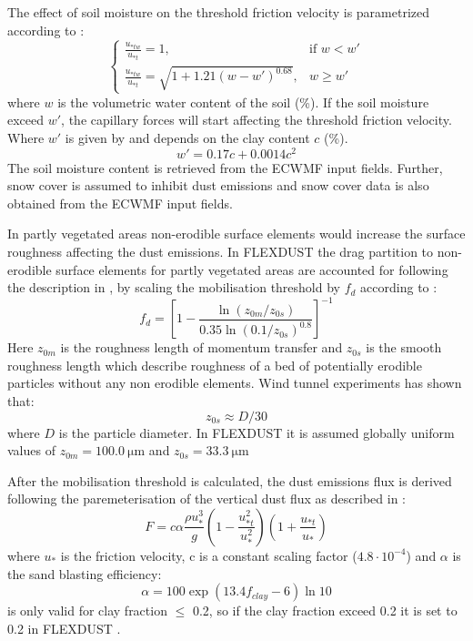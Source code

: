 The effect of soil moisture on the threshold friction velocity is parametrized according to \textcite{fecan1998parametrization}:
\begin{equation}
    \begin{cases}
    \frac{u_{*tw}}{u_{*t}}=1, & \text{if } w < w' \\
    \frac{u_{*tw}}{u_{*t}}=\sqrt{1+1.21(w-w')^{0.68}}, & w \geq w'
    \end{cases}
\end{equation}
where $w$ is the volumetric water content of the soil (\%). If the soil moisture exceed $w'$, the capillary 
forces will start affecting the threshold friction velocity. Where $w'$ is given by  
and depends on the clay content $c$ (\%).   
\begin{equation} \label{eq:moisture_clay}
    w' = 0.17c + 0.0014c^2
\end{equation}
The soil moisture content is retrieved from the ECWMF input fields. Further, snow cover is 
assumed to inhibit dust emissions and snow cover data is also obtained from the ECWMF input fields. 
\par In partly vegetated areas non-erodible surface elements would increase the surface 
roughness affecting the dust emissions. In FLEXDUST the drag partition to non-erodible 
surface elements for partly vegetated areas are accounted for following the description in 
\parencite{zender2003mineral}, by scaling the mobilisation threshold by $f_d$ according to :
\begin{equation}\label{eq:drag_partition}
    f_d = \left[1 - \frac{\ln (z_{0m}/z_{0s})}{0.35\ln (0.1/z_{0s})^{0.8}}\right]^{-1}
\end{equation}
Here $z_{0m}$ is the roughness length of momentum transfer and $z_{0s}$ is the smooth roughness length which 
describe roughness of a bed of potentially erodible particles without any non erodible elements. Wind tunnel 
experiments has shown that: 
\begin{equation}
    z_{0s} \approx D/30
\end{equation}
where $D$ is the particle diameter. In FLEXDUST it is assumed globally uniform values of  $z_{0m}=\SI{100.0}{\micro\metre}$ and $z_{0s}=\SI{33.3}{\micro\metre}$

After the mobilisation threshold is calculated,  the dust emissions flux is derived following the paremeterisation of the vertical dust flux as described in \textcite{MB95_dust_emission}: 
\begin{equation}
    F=c\alpha \frac{\rho u_{*}^3}{g}\left(1-\frac{u^2_{*t}}{u^2_*}\right)\left(1+ \frac{u_{*t}}{u_*}\right)
\end{equation}
where $u_*$ is the friction velocity, c is a constant scaling factor ($4.8\cdot 10^{-4}$) and $\alpha$ is the sand blasting efficiency:
\begin{equation}\label{eq:sand_blasing_eff}
    \alpha = 100\exp{(13.4f_{clay}-6)\ln 10}
\end{equation}
 is only valid for clay fraction $\leq$ 0.2, so if the clay fraction exceed 0.2 it is set to 0.2 in FLEXDUST \parencite{zender2003mineral}. 



